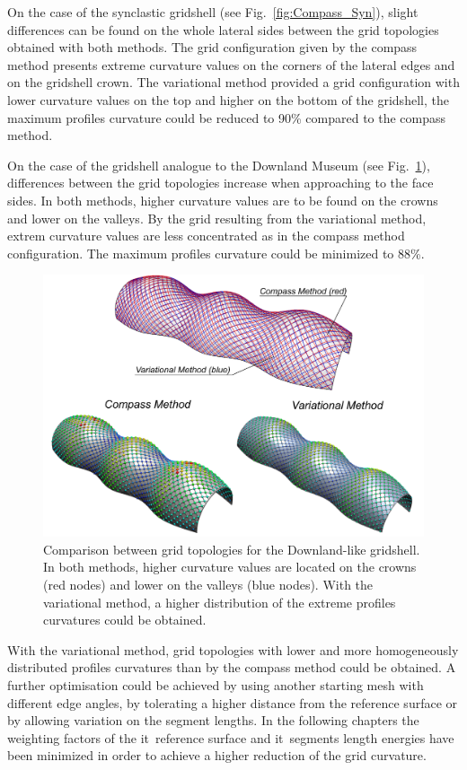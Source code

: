 On the case of the synclastic gridshell (see Fig.~\ref{fig:Compass_Syn}), slight differences can be found on the whole lateral sides between the grid topologies obtained with both methods. The grid configuration given by the compass method presents extreme curvature values on the corners of the lateral edges and on the gridshell crown. The variational method provided a grid configuration with lower curvature values on the top and higher on the bottom of the gridshell, the  maximum profiles curvature could be reduced to 90\% compared to the compass method.

On the case of the gridshell analogue to the Downland Museum (see Fig.~\ref{fig:Compass_Downland}), differences between the grid topologies increase when approaching to the face sides. In both methods, higher curvature values are to be found on the crowns and lower on the valleys. By the grid resulting from the variational method, extrem curvature values are less concentrated as in the compass method configuration. The maximum profiles curvature could be minimized to 88\%.

\begin{figure}[ht]
\centering
\includegraphics[width=0.80\linewidth]{images/CaseStudies_Regular/Compass_Downland.png}
\caption{Comparison between grid topologies for the Downland-like gridshell. In both methods, higher curvature values are located on the crowns (red nodes) and lower on the valleys (blue nodes). With the variational method, a higher distribution of the extreme profiles curvatures could be obtained.}
\label{fig:Compass_Downland}
\end{figure}

With the variational method, grid topologies with lower and more homogeneously distributed profiles curvatures than by the compass method could be obtained. A further optimisation could be achieved by using another starting mesh with different edge angles, by tolerating a higher distance from the reference surface or by allowing variation on the segment lengths. In the following chapters the weighting factors of the {it\ reference surface} and {it\ segments length} energies have been minimized in order to achieve a higher reduction of the grid curvature.

